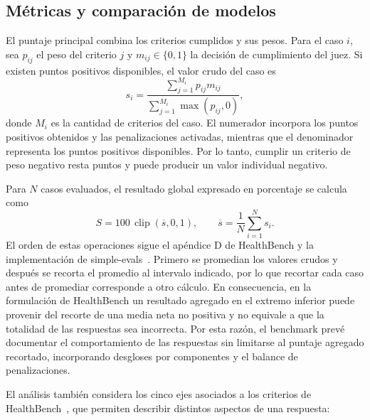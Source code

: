\subsection{Métricas y comparación de modelos}
\label{sec:evaluacion-metricas}
El puntaje principal combina los criterios cumplidos y sus pesos. Para el caso $i$, sea $p_{ij}$ el peso del criterio $j$ y $m_{ij}\in\{0,1\}$ la decisión de cumplimiento del juez. Si existen puntos positivos disponibles, el valor crudo del caso es
\begin{equation}
s_i=\frac{\sum_{j=1}^{M_i}p_{ij}m_{ij}}
{\sum_{j=1}^{M_i}\max(p_{ij},0)},
\label{eq:healthbench-caso}
\end{equation}
donde $M_i$ es la cantidad de criterios del caso. El numerador incorpora los puntos positivos obtenidos y las penalizaciones activadas, mientras que el denominador representa los puntos positivos disponibles. Por lo tanto, cumplir un criterio de peso negativo resta puntos y puede producir un valor individual negativo.

Para $N$ casos evaluados, el resultado global expresado en porcentaje se calcula como
\begin{equation}
S=100\,\operatorname{clip}\!\left(\overline{s},0,1\right),
\qquad \overline{s}=\frac{1}{N}\sum_{i=1}^{N}s_i.
\label{eq:healthbench-global}
\end{equation}
El orden de estas operaciones sigue el apéndice D de HealthBench y la implementación de simple-evals~\cite{arora2025healthbench,openai2026healthbenchcode}. Primero se promedian los valores crudos y después se recorta el promedio al intervalo indicado, por lo que recortar cada caso antes de promediar corresponde a otro cálculo. En consecuencia, en la formulación de HealthBench un resultado agregado en el extremo inferior puede provenir del recorte de una media neta no positiva y no equivale a que la totalidad de las respuestas sea incorrecta. Por esta razón, el benchmark prevé documentar el comportamiento de las respuestas sin limitarse al puntaje agregado recortado, incorporando desgloses por componentes y el balance de penalizaciones.

El análisis también considera los cinco ejes asociados a los criterios de HealthBench~\cite{arora2025healthbench}, que permiten describir distintos aspectos de una respuesta:

